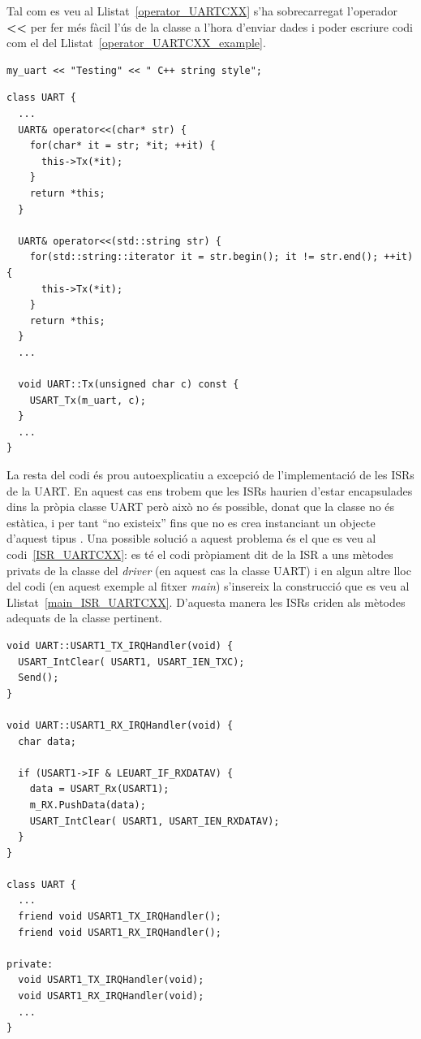 Tal com es veu al Llistat~\ref{operator_UARTCXX} s'ha sobrecarregat l'operador {\bf<{}<} per fer més fàcil l'ús de la classe a l'hora d'enviar dades i poder escriure codi com el del Llistat~\ref{operator_UARTCXX_example}.

\begin{lstlisting}[style=customc,caption=Ús de l'operador <{}< de la classe UART,label=operator_UARTCXX_example]
  my_uart << "Testing" << " C++ string style";
\end{lstlisting}


\begin{lstlisting}[style=customc,caption=Implementació de l'operador <{}< per la classe UART,label=operator_UARTCXX]
class UART {
  ...
  UART& operator<<(char* str) {
    for(char* it = str; *it; ++it) {
      this->Tx(*it);
    }
    return *this;
  }

  UART& operator<<(std::string str) {
    for(std::string::iterator it = str.begin(); it != str.end(); ++it) {
      this->Tx(*it);
    }
    return *this;
  }
  ...

  void UART::Tx(unsigned char c) const {
    USART_Tx(m_uart, c);
  }
  ...
}

\end{lstlisting}

La resta del codi és prou autoexplicatiu a excepció de l'implementació de les \glspl{ISR} de la UART. En aquest cas ens trobem que les \glspl{ISR} haurien d'estar encapsulades dins la pròpia classe UART però això no és possible, donat que la classe no és estàtica, i per tant ``no existeix'' fins que no es crea instanciant un objecte d'aquest tipus \cite{ISRCXX}\cite{ISRCXX_2}. Una possible solució a aquest problema és el que es veu al codi~\ref{ISR_UARTCXX}: es té el codi pròpiament dit de la \gls{ISR} a uns mètodes privats de la classe del {\em driver} (en aquest cas la classe UART) i en algun altre lloc del codi (en aquest exemple al fitxer {\em main}) s'insereix la construcció que es veu al Llistat~\ref{main_ISR_UARTCXX}. D'aquesta manera les \glspl{ISR} criden als mètodes adequats de la classe pertinent.

\begin{lstlisting}[style=customc,caption=Implementació de les ISRs en C++,label=ISR_UARTCXX]
void UART::USART1_TX_IRQHandler(void) {
  USART_IntClear( USART1, USART_IEN_TXC);
  Send();
}

void UART::USART1_RX_IRQHandler(void) {
  char data;

  if (USART1->IF & LEUART_IF_RXDATAV) {
    data = USART_Rx(USART1);
    m_RX.PushData(data);
    USART_IntClear( USART1, USART_IEN_RXDATAV);
  }
}

class UART {
  ...
  friend void USART1_TX_IRQHandler();
  friend void USART1_RX_IRQHandler();

private:
  void USART1_TX_IRQHandler(void);
  void USART1_RX_IRQHandler(void);
  ...
}
\end{lstlisting}

